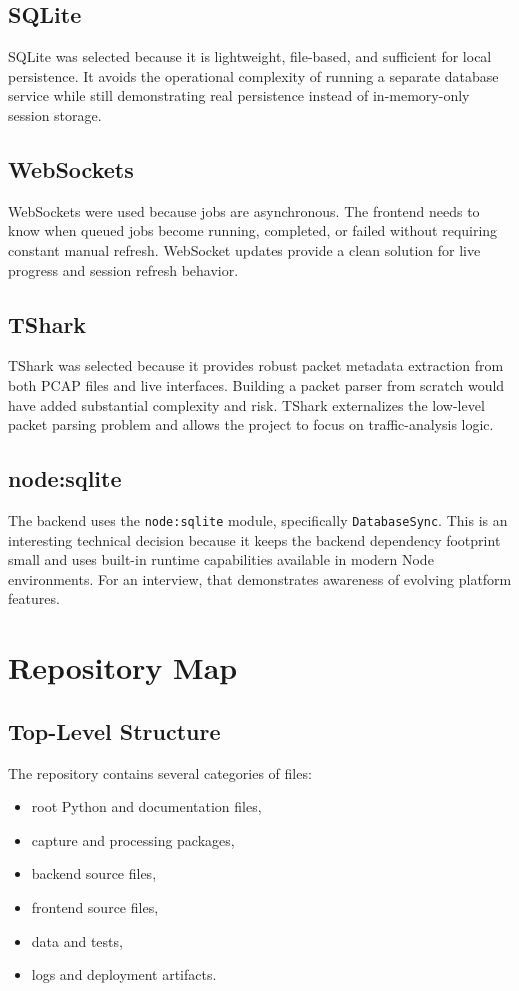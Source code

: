 \documentclass[12pt,a4paper]{report}
\begin{document}
\section{SQLite}
SQLite was selected because it is lightweight, file-based, and sufficient for local persistence. It avoids the operational complexity of running a separate database service while still demonstrating real persistence instead of in-memory-only session storage.

\section{WebSockets}
WebSockets were used because jobs are asynchronous. The frontend needs to know when queued jobs become running, completed, or failed without requiring constant manual refresh. WebSocket updates provide a clean solution for live progress and session refresh behavior.

\section{TShark}
TShark was selected because it provides robust packet metadata extraction from both PCAP files and live interfaces. Building a packet parser from scratch would have added substantial complexity and risk. TShark externalizes the low-level packet parsing problem and allows the project to focus on traffic-analysis logic.

\section{node:sqlite}
The backend uses the \texttt{node:sqlite} module, specifically \texttt{DatabaseSync}. This is an interesting technical decision because it keeps the backend dependency footprint small and uses built-in runtime capabilities available in modern Node environments. For an interview, that demonstrates awareness of evolving platform features.

\chapter{Repository Map}
\section{Top-Level Structure}
The repository contains several categories of files:
\begin{itemize}[leftmargin=1.5em]
    \item root Python and documentation files,
    \item capture and processing packages,
    \item backend source files,
    \item frontend source files,
    \item data and tests,
    \item logs and deployment artifacts.
\end{itemize}
\end{document}
